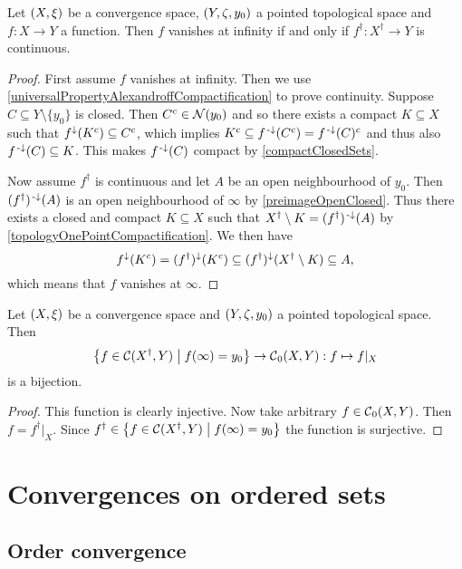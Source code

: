 \begin{proposition} \label{vanishesAtInfinityIffBasepointExtensionContinuous}
Let $\sSet{X,\xi}$ be a convergence space, $\sSet{Y,\zeta, y_0}$ a pointed topological space and $f:X\to Y$ a function. Then $f$ vanishes at infinity \textup{if and only if} $f^\dagger: X^\dagger \to Y$ is continuous.
\end{proposition}
\begin{proof}
First assume $f$ vanishes at infinity. Then we use \ref{universalPropertyAlexandroffCompactification} to prove continuity. Suppose $C\subseteq Y\setminus\{y_0\}$ is closed. Then $C^c \in \operatorname{\mathcal{N}}(y_0)$ and so there exists a compact $K\subseteq X$ such that $f^\downarrow(K^c)\subseteq C^c$, which implies $K^c \subseteq f^{\text{\hspace{0.15em}-}\downarrow}(C^c) = f^{\text{\hspace{0.15em}-}\downarrow}(C)^c$ and thus also $f^{\text{\hspace{0.15em}-}\downarrow}(C)\subseteq K$. This makes $f^{\text{\hspace{0.15em}-}\downarrow}(C)$ compact by \ref{compactClosedSets}.

Now assume $f^\dagger$ is continuous and let $A$ be an open neighbourhood of $y_0$. Then $(f^\dagger)^{\text{\hspace{0.15em}-}\downarrow}(A)$ is an open neighbourhood of $\infty$ by \ref{preimageOpenClosed}. Thus there exists a closed and compact $K\subseteq X$ such that $X^\dagger\setminus K = (f^\dagger)^{\text{\hspace{0.15em}-}\downarrow}(A)$ by \ref{topologyOnePointCompactification}. We then have
\[ f^\downarrow(K^c) = (f^\dagger)^\downarrow(K^c) \subseteq (f^\dagger)^\downarrow(X^\dagger \setminus K) \subseteq A, \]
which means that $f$ vanishes at $\infty$.
\end{proof}
\begin{corollary} \label{functionVanishingAtInftyIffRestrictionOfContinuousBasepointPreservingFunction}
Let $\sSet{X,\xi}$ be a convergence space and $\sSet{Y,\zeta, y_0}$ a pointed topological space. Then
\[ \setbuilder{f\in \cont(X^\dagger, Y)}{f(\infty) = y_0} \to \cont_0(X,Y): f\mapsto f|_X \]
is a bijection.
\end{corollary}
\begin{proof}
This function is clearly injective. Now take arbitrary $f\in \operatorname{\mathcal{C}}_0(X,Y)$. Then $f = f^\dagger|_X$. Since $f^\dagger\in \setbuilder{f\in \cont(X^\dagger, Y)}{f(\infty) = y_0}$ the function is surjective.
\end{proof}



\section{Convergences on ordered sets}
\subsection{Order convergence}
